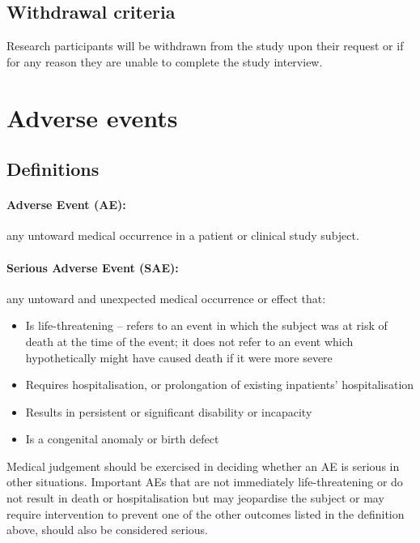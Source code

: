 \documentclass[a4paper,10pt]{article}
\begin{document}
\subsection{Withdrawal criteria} 
Research participants will be withdrawn from the study upon their request or if for any reason they are unable to complete the study interview. 

\section{Adverse events}

\subsection{Definitions}

\paragraph{Adverse Event (AE):}any untoward medical occurrence in a patient or clinical study subject.  

\paragraph{Serious Adverse Event (SAE):}any untoward and unexpected medical occurrence or effect that:  \begin{itemize} 
	\item Is life-threatening – refers to an event in which the subject was at risk of death at the time of the event; it does not refer to an event which hypothetically might have caused death if it were more severe
	\item Requires hospitalisation, or prolongation of existing inpatients’ hospitalisation
    \item Results in persistent or significant disability or incapacity
	\item Is a congenital anomaly or birth defect
                                                                                               \end{itemize} 


Medical judgement should be exercised in deciding whether an AE is serious in other situations. Important AEs that are not immediately life-threatening or do not result in death or hospitalisation but may jeopardise the subject or may require intervention to prevent one of the other outcomes listed in the definition above, should also be considered serious.
\end{document}
